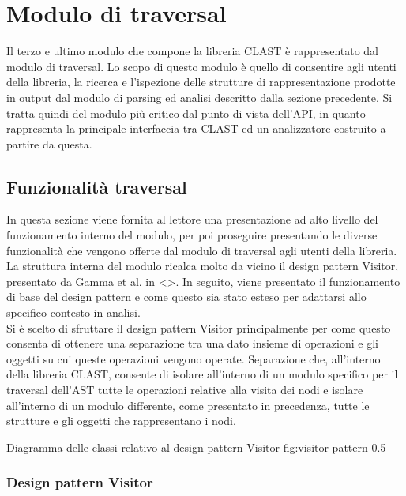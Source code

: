 \section{Modulo di traversal}

Il terzo e ultimo modulo che compone la libreria CLAST è rappresentato dal
modulo di traversal. Lo scopo di questo modulo è quello di consentire agli
utenti della libreria, la ricerca e l'ispezione delle strutture di
rappresentazione prodotte in output dal modulo di parsing ed analisi descritto
dalla sezione precedente. Si tratta quindi del modulo più critico dal punto di
vista dell'API, in quanto rappresenta la principale interfaccia tra CLAST ed
un analizzatore costruito a partire da questa.

\subsection{Funzionalità traversal}

In questa sezione viene fornita al lettore una presentazione ad alto livello
del funzionamento interno del modulo, per poi proseguire presentando le
diverse funzionalità che vengono offerte dal modulo di traversal agli utenti
della libreria.\\

La struttura interna del modulo ricalca molto da vicino il design pattern
Visitor, presentato da Gamma et al. in <>. In seguito, viene presentato il
funzionamento di base del design pattern e come questo sia stato esteso per
adattarsi allo specifico contesto in analisi.\\

Si è scelto di sfruttare il design pattern Visitor principalmente per come
questo consenta di ottenere una separazione tra una dato insieme di operazioni
e gli oggetti su cui queste operazioni vengono operate. Separazione che,
all'interno della libreria CLAST, consente di isolare all'interno di un modulo
specifico per il traversal dell'AST tutte le operazioni relative alla visita
dei nodi e isolare all'interno di un modulo differente, come presentato in
precedenza, tutte le strutture e gli oggetti che rappresentano i nodi.

      {Diagramma delle classi relativo al design pattern Visitor}
      {fig:visitor-pattern}
      {0.5}

\subsubsection{Design pattern Visitor}

